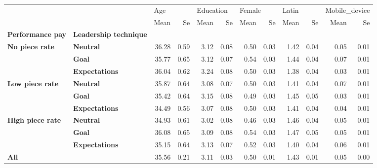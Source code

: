 \begin{tabular}{llrrrrrrrrrr}
\toprule
    &              & \multicolumn{2}{l}{Age} & \multicolumn{2}{l}{Education} & \multicolumn{2}{l}{Female} & \multicolumn{2}{l}{Latin} & \multicolumn{2}{l}{Mobile\_device} \\
    &              &  Mean &   Se &      Mean &   Se &   Mean &   Se &  Mean &   Se &          Mean &   Se \\
\textbf{Performance pay} & \textbf{Leadership technique} &       &      &           &      &        &      &       &      &               &      \\
\midrule
\textbf{No piece rate} & \textbf{Neutral} & 36.28 & 0.59 &      3.12 & 0.08 &   0.50 & 0.03 &  1.42 & 0.04 &          0.05 & 0.01 \\
    & \textbf{Goal} & 35.77 & 0.65 &      3.12 & 0.07 &   0.54 & 0.03 &  1.44 & 0.04 &          0.07 & 0.01 \\
    & \textbf{Expectations} & 36.04 & 0.62 &      3.24 & 0.08 &   0.50 & 0.03 &  1.38 & 0.04 &          0.03 & 0.01 \\
\textbf{Low piece rate} & \textbf{Neutral} & 35.87 & 0.64 &      3.08 & 0.07 &   0.50 & 0.03 &  1.41 & 0.04 &          0.07 & 0.01 \\
    & \textbf{Goal} & 35.42 & 0.64 &      3.15 & 0.08 &   0.49 & 0.03 &  1.45 & 0.05 &          0.03 & 0.01 \\
    & \textbf{Expectations} & 34.49 & 0.56 &      3.07 & 0.08 &   0.50 & 0.03 &  1.41 & 0.04 &          0.04 & 0.01 \\
\textbf{High piece rate} & \textbf{Neutral} & 34.93 & 0.61 &      3.02 & 0.08 &   0.46 & 0.03 &  1.46 & 0.04 &          0.05 & 0.01 \\
    & \textbf{Goal} & 36.08 & 0.65 &      3.09 & 0.08 &   0.54 & 0.03 &  1.47 & 0.05 &          0.05 & 0.01 \\
    & \textbf{Expectations} & 35.15 & 0.64 &      3.13 & 0.07 &   0.52 & 0.03 &  1.40 & 0.04 &          0.06 & 0.01 \\
\textbf{All} &              & 35.56 & 0.21 &      3.11 & 0.03 &   0.50 & 0.01 &  1.43 & 0.01 &          0.05 & 0.00 \\
\bottomrule
\end{tabular}
